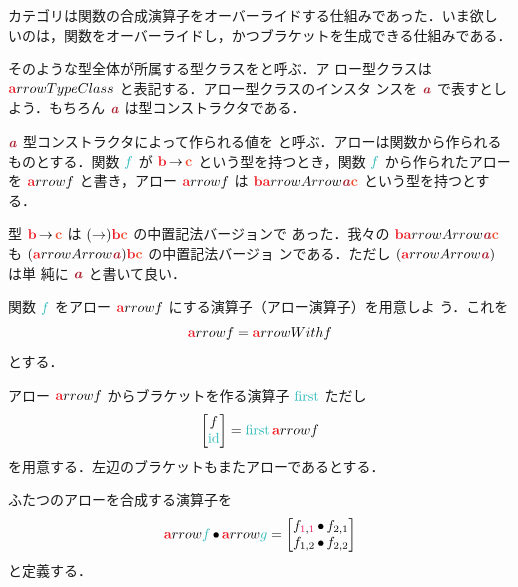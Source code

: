 \documentclass[a5paper,twoside,fleqn,draft]{jsbook}
\begin{document}
\separator

カテゴリは関数の合成演算子をオーバーライドする仕組みであった．いま欲し
いのは，関数をオーバーライドし，かつブラケットを生成できる仕組みである．

そのような型全体が所属する型クラスをと呼ぶ．ア
ロー型クラスは $\hTypeName{a}rrowTypeClass$ と表記する．アロー型クラスのインスタ
ンスを $\mTypeConstructor{a}$ で表すとしよう．もちろん
$\mTypeConstructor{a}$ は型コンストラクタである．

$\mTypeConstructor{a}$ 型コンストラクタによって作られる値を
と呼ぶ．アローは関数から作られるものとする．関数 $\hFunc{f}$
が $\hTypeName{b}\hFunctionArrow\mC$ という型を持つとき，関数 $\hFunc{f}$ から作られたアロー
を $\hTypeName{a}rrow{f}$ と書き，アロー $\hTypeName{a}rrow{f}$ は
$\hTypeName{b}\hTypeName{a}rrowArrow{\mTypeConstructor{a}}\mC$ という型を持つとす
る．

型 $\hTypeName{b}\hFunctionArrow\mC$ は $(\hFunctionArrow)\hTypeName{b}\mC$ の中置記法バージョンで
あった．我々の $\hTypeName{b}\hTypeName{a}rrowArrow{\mTypeConstructor{a}}\mC$ も
$(\hTypeName{a}rrowArrow{\mTypeConstructor{a}})\hTypeName{b}\mC$ の中置記法バージョ
ンである．ただし $(\hTypeName{a}rrowArrow{\mTypeConstructor{a}})$ は単
純に $\mTypeConstructor{a}$ と書いて良い．

\separator

関数 $\hFunc{f}$ をアロー $\hTypeName{a}rrow{f}$ にする演算子（アロー演算子）を用意しよ
う．これを
\begin{equation}
  \hTypeName{a}rrow{f}
  =\hTypeName{a}rrowWith{f}
\end{equation}
とする．

アロー $\hTypeName{a}rrow{f}$ からブラケットを作る演算子 $\mFirst$ ただし
\begin{equation}
  \begin{bmatrix}
    f\\
    \mId
  \end{bmatrix}
  =
  \mFirst\hTypeName{a}rrow{f}
\end{equation}
を用意する．左辺のブラケットもまたアローであるとする．

ふたつのアローを合成する演算子を
\begin{equation}
  \hTypeName{a}rrow{\hFunc{f}}\mCompCat\hTypeName{a}rrow{\hFunc{g}}
  =
  \begin{bmatrix}
    f_{\hConstant{1},\hConstant{1}}\hCompose f_{2,1}\\
    f_{1,2}\hCompose f_{2,2}
  \end{bmatrix}
\end{equation}
と定義する．
\end{document}
